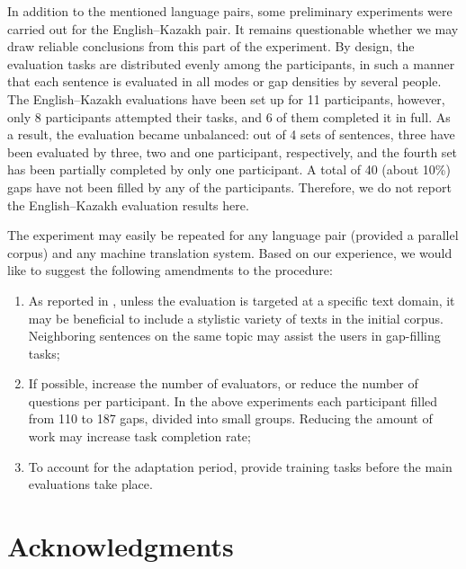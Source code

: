 \documentclass[11pt]{article}
\newcommand{\comment}[1]{}
\begin{document}
In addition to the mentioned language pairs, some preliminary experiments were carried out for the English--Kazakh pair. It remains questionable whether we may draw reliable conclusions from this part of the experiment. By design, the evaluation tasks are distributed evenly among the participants, in such a manner that each sentence is evaluated in all modes or gap densities by several people. The English--Kazakh evaluations have been set up for 11 participants, however, only 8 participants attempted their tasks, and 6 of them completed it in full. As a result, the evaluation became unbalanced: out of 4 sets of sentences, three have been evaluated by three, two and one participant, respectively, and the fourth set has been partially completed by only one participant. A total of 40 (about 10\%) gaps have not been filled by any of the participants. Therefore, we do not report the English--Kazakh evaluation results here.

The experiment may easily be repeated for any language pair (provided a parallel corpus) and
any machine translation system. Based on our experience, we would like to suggest the following amendments to the procedure:
\begin{enumerate}\itemsep 0ex
\item As reported in \cite{oregan13}, unless the evaluation is targeted at a specific text domain, it may be beneficial to include a stylistic variety of texts in the initial corpus. Neighboring sentences on the same topic may assist the users in gap-filling tasks;
\item If possible, increase the number of evaluators, or reduce the number of questions per participant. In the above experiments each participant filled from 110 to 187 gaps, divided into small groups. Reducing the amount of work may increase task completion rate;\comment{MLF's crazy idea: recaptchas?}\comment{EA: the participants did not leave the gaps empty, they just did not attempt the next portions of evaluation after finishing some and getting bored. or did I misunderstand the use of captchas? }
\item To account for the adaptation period, provide training tasks before the main evaluations take place.
\end{enumerate}

\section*{Acknowledgments}






\comment{EA: urls do not show up in web citations, how can I fix that?}

\end{document}
